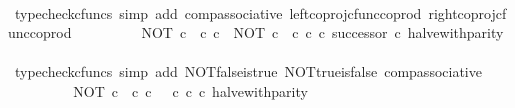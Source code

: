 \begin{isabellebody}
\ \ \ \ \ \ \isamarkupfalse%
\ {\isacharparenleft}{\kern0pt}typecheck{\isacharunderscore}{\kern0pt}cfuncs{\isacharcomma}{\kern0pt}\ simp\ add{\isacharcolon}{\kern0pt}\ comp{\isacharunderscore}{\kern0pt}associative{}\ left{\isacharunderscore}{\kern0pt}coproj{\isacharunderscore}{\kern0pt}cfunc{\isacharunderscore}{\kern0pt}coprod\ right{\isacharunderscore}{\kern0pt}coproj{\isacharunderscore}{\kern0pt}cfunc{\isacharunderscore}{\kern0pt}coprod{\isacharparenright}{\kern0pt}\isanewline
\ \ \ \ \isamarkupfalse%
\ \isamarkupfalse%
\ {\isachardoublequoteopen}{\isachardot}{\kern0pt}{\isachardot}{\kern0pt}{\isachardot}{\kern0pt}\ {\isacharequal}{\kern0pt}\ {\isacharparenleft}{\kern0pt}{\isacharparenleft}{\kern0pt}NOT\ {\isasymcirc}\isactrlsub c\ {\isasymf}\ {\isasymcirc}\isactrlsub c\ {\isasymbeta}\isactrlbsub {\isasymnat}\isactrlsub c\isactrlesub {\isacharparenright}{\kern0pt}\ {\isasymamalg}\ {\isacharparenleft}{\kern0pt}NOT\ {\isasymcirc}\isactrlsub c\ {\isasymt}\ {\isasymcirc}\isactrlsub c\ {\isasymbeta}\isactrlbsub {\isasymnat}\isactrlsub c\isactrlesub \ {\isasymcirc}\isactrlsub c\ successor{\isacharparenright}{\kern0pt}{\isacharparenright}{\kern0pt}\ {\isasymcirc}\isactrlsub c\ halve{\isacharunderscore}{\kern0pt}with{\isacharunderscore}{\kern0pt}parity{\isachardoublequoteclose}\isanewline
\ \ \ \ \ \ \isamarkupfalse%
\ {\isacharparenleft}{\kern0pt}typecheck{\isacharunderscore}{\kern0pt}cfuncs{\isacharcomma}{\kern0pt}\ simp\ add{\isacharcolon}{\kern0pt}\ NOT{\isacharunderscore}{\kern0pt}false{\isacharunderscore}{\kern0pt}is{\isacharunderscore}{\kern0pt}true\ NOT{\isacharunderscore}{\kern0pt}true{\isacharunderscore}{\kern0pt}is{\isacharunderscore}{\kern0pt}false\ comp{\isacharunderscore}{\kern0pt}associative{}{\isacharparenright}{\kern0pt}\isanewline
\ \ \ \ \isamarkupfalse%
\ \isamarkupfalse%
\ {\isachardoublequoteopen}{\isachardot}{\kern0pt}{\isachardot}{\kern0pt}{\isachardot}{\kern0pt}\ {\isacharequal}{\kern0pt}\ NOT\ {\isasymcirc}\isactrlsub c\ {\isacharparenleft}{\kern0pt}{\isasymf}\ {\isasymcirc}\isactrlsub c\ {\isasymbeta}\isactrlbsub {\isasymnat}\isactrlsub c\isactrlesub {\isacharparenright}{\kern0pt}\ {\isasymamalg}\ {\isacharparenleft}{\kern0pt}{\isasymt}\ {\isasymcirc}\isactrlsub c\ {\isasymbeta}\isactrlbsub {\isasymnat}\isactrlsub c\isactrlesub {\isacharparenright}{\kern0pt}\ {\isasymcirc}\isactrlsub c\ halve{\isacharunderscore}{\kern0pt}with{\isacharunderscore}{\kern0pt}parity{\isachardoublequoteclose}\isanewline
\ \ \ \ \ \ \isamarkupfalse%

\end{isabellebody}
